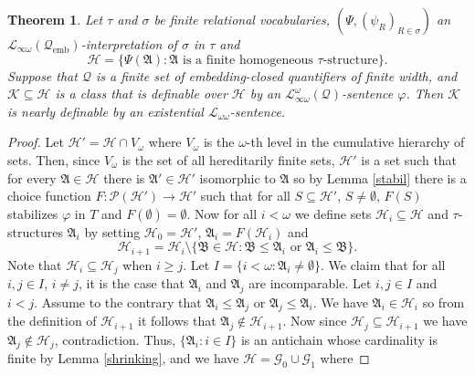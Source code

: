 \documentclass{ndjflart}
\theoremstyle{plain}
\newtheorem{theorem}[conjecture]{Theorem}
\theoremstyle{definition}
\numberwithin{equation}{section}
\DeclareMathOperator{\emb}{emb}
\begin{document}
\begin{theorem}\label{log_eq}
Let $\tau$ and $\sigma$ be finite relational vocabularies,
$(\Psi, (\psi_R)_{R \in \sigma})$ an
$\mathcal{L}_{\infty \omega}(\mathcal{Q}_{\emb})$-interpretation of $\sigma$ in
$\tau$ and
\[
\mathcal{H} = \{\Psi(\mathfrak{A})
\colon \mathfrak{A} \text{ is a finite homogeneous } \tau \text{-structure}\}.
\]
Suppose that $\mathcal{Q}$ is a finite set
of embedding-closed quantifiers of finite width,
and $\mathcal{K} \subseteq \mathcal{H}$
is a class that is definable over $\mathcal{H}$ by an
$\mathcal{L}^{\omega}_{\infty\omega}(\mathcal{Q})$-sentence $\varphi$.
Then $\mathcal{K}$ is nearly definable by an existential
$\mathcal{L}_{\omega\omega}$-sentence.
\end{theorem}
\begin{proof}
Let $\mathcal{H}' = \mathcal{H} \cap V_{\omega}$ where $V_{\omega}$ is the
$\omega$-th level in the cumulative hierarchy of sets.
Then, since $V_{\omega}$ is the set of all hereditarily finite sets,
$\mathcal{H}'$ is a set such that for every $\mathfrak{A} \in \mathcal{H}$ there
is $\mathfrak{A}' \in \mathcal{H}'$ isomorphic to $\mathfrak{A}$ so by Lemma
\ref{stabil} there is a choice function
$F\colon \mathcal{P}(\mathcal{H}') \rightarrow \mathcal{H}'$ such that
for all $S \subseteq \mathcal{H}'$, $S \ne \emptyset$, $F(S)$ stabilizes
$\varphi$ in $T$ and $F(\emptyset) = \emptyset$.
Now for all $i < \omega$ we define sets $\mathcal{H}_i \subseteq \mathcal{H}$
and $\tau$-structures $\mathfrak{A}_i$ by setting $\mathcal{H}_0 = \mathcal{H}'$,
$\mathfrak{A}_i = F(\mathcal{H}_i)$ and
\[
	\mathcal{H}_{i+1} = \mathcal{H}_i \setminus \{ \mathfrak{B} \in \mathcal{H} \colon
	\mathfrak{B} \leq \mathfrak{A}_i \text{ or } \mathfrak{A}_i \leq \mathfrak{B} \}.
\]
Note that $\mathcal{H}_i \subseteq \mathcal{H}_j$ when $i \geq j$.
Let $I = \{i<\omega \colon \mathfrak{A}_i \ne \emptyset \}$.
We claim that for all $i,j \in I$, $i \ne j$, it is the case that
$\mathfrak{A}_i$ and $\mathfrak{A}_j$ are incomparable.
Let $i,j \in I$ and $i < j$.
Assume to the contrary that $\mathfrak{A}_i \leq \mathfrak{A}_j$ or
$\mathfrak{A}_j \leq \mathfrak{A}_i$.
We have $\mathfrak{A}_i \in \mathcal{H}_i$ so from the definition of
$\mathcal{H}_{i+1}$ it follows that $\mathfrak{A}_j \notin \mathcal{H}_{i+1}$.
Now since $\mathcal{H}_j \subseteq \mathcal{H}_{i+1}$ we have
$\mathfrak{A}_j \notin \mathcal{H}_j$, contradiction.
Thus, $\{\mathfrak{A}_i\colon i\in I \}$ is an antichain whose cardinality is
finite by Lemma \ref{shrinking}, and we have
$\mathcal{H} = \mathcal{G}_0 \cup \mathcal{G}_1$ where

\end{proof}
\end{document}
